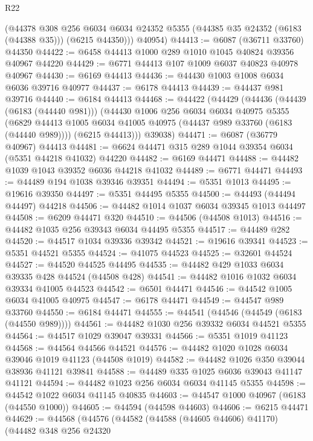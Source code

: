 \begin{lexlean}{R22}
\begin{coremodule}
        (@44378
          @308
          @256
          @6034
          @6034
          @24352
          @5355
          (@44385 @35 @24352 (@6183 (@44388 @35)))
          (@6215 @44350)))
      @40954)
@44413 := @6087 (@36711 @33760) @44350
@44422 := @6458 @44413 @1000 @289 @1010 @1045 @40824 @39356 @40967 @44220
@44429 := @6771 @44413 @107 @1009 @6037 @40823 @40978 @40967
@44430 := @6169 @44413
@44436 := @44430 @1003 @1008 @6034 @6036 @39716 @40977
@44437 := @6178 @44413
@44439 := @44437 @981 @39716
@44440 := @6184 @44413
@44468 := @44422
    (@44429
      (@44436
        (@44439 (@6183 (@44440 @981)))
        (@44430
          @1006
          @256
          @6034
          @6034
          @40975
          @5355
          (@6829 @44413 @1005 @6034 @41005 @40975 (@44437 @989 @33760 (@6183 (@44440 @989))))
          (@6215 @44413)))
      @39038)
@44471 := @6087 (@36779 @40967) @44413
@44481 := @6624 @44471 @315 @289 @1044 @39354 @6034 (@5351 @44218 @41032) @44220
@44482 := @6169 @44471
@44488 := @44482 @1039 @1043 @39352 @6036 @44218 @41032
@44489 := @6771 @44471
@44493 := @44489 @194 @1038 @39346 @39351
@44494 := @5351 @1013
@44495 := @19616 @39350
@44497 := @5351 @44495 @5355
@44500 := @44493 (@44494 @44497) @44218
@44506 := @44482 @1014 @1037 @6034 @39345 @1013 @44497
@44508 := @6209 @44471 @320
@44510 := @44506 (@44508 @1013)
@44516 := @44482 @1035 @256 @39343 @6034 @44495 @5355
@44517 := @44489 @282
@44520 := @44517 @1034 @39336 @39342
@44521 := @19616 @39341
@44523 := @5351 @44521 @5355
@44524 := @41075 @44523
@44525 := @32601 @44524
@44527 := @44520 @44525 @44495
@44535 := @44482 @429 @1033 @6034 @39335 @428 @44524 (@44508 @428)
@44541 := @44482 @1016 @1032 @6034 @39334 @41005 @44523
@44542 := @6501 @44471
@44546 := @44542 @1005 @6034 @41005 @40975
@44547 := @6178 @44471
@44549 := @44547 @989 @33760
@44550 := @6184 @44471
@44555 := @44541 (@44546 (@44549 (@6183 (@44550 @989))))
@44561 := @44482 @1030 @256 @39332 @6034 @44521 @5355
@44564 := @44517 @1029 @39047 @39331
@44566 := @5351 @1019 @41123
@44568 := @44564 @44566 @44521
@44576 := @44482 @1020 @1028 @6034 @39046 @1019 @41123 (@44508 @1019)
@44582 := @44482 @1026 @350 @39044 @38936 @41121 @39841
@44588 := @44489 @335 @1025 @6036 @39043 @41147 @41121
@44594 := @44482 @1023 @256 @6034 @6034 @41145 @5355
@44598 := @44542 @1022 @6034 @41145 @40835
@44603 := @44547 @1000 @40967 (@6183 (@44550 @1000))
@44605 := @44594 (@44598 @44603)
@44606 := @6215 @44471
@44629 := @44568
    (@44576
      (@44582
        (@44588 (@44605 @44606) @41170)
        (@44482
          @348
          @256
          @24320

\end{coremodule}
\end{lexlean}
